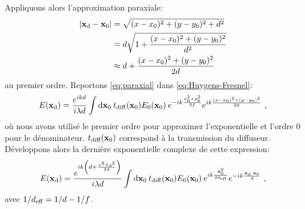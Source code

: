 Appliquons alors l'approximation paraxiale:
\begin{align}
\left| \mathbf{x}_{\mathrm{d}} - \mathbf{x}_0 \right| &= \sqrt{(x-x_0)^2+(y-y_0)^2+d^2} \\
& = d \sqrt{1+\frac{(x-x_0)^2+(y-y_0)^2}{d^2}} \\
& \approx d+ \frac{(x-x_0)^2+(y-y_0)^2}{2d}
\label{eq:paraxial}
\end{align}
au premier ordre. Reportons \ref{eq:paraxial} dans \ref{eq:Huygens-Fresnel}:
\begin{equation}
E(\mathbf{x}_{\mathrm{d}})=\frac{e^{ikd}}{i \lambda d} \int{\mathop{}\mathopen{}\mathrm{d}\mathbf{x}_0\: t_{\mathrm{diff}}(\mathbf{x}_0) E_0(\mathbf{x}_0) \: e^{-ik \frac{x_0^2+y_0^2}{2f}} e^{ik \frac{(x-x_0)^2+(y-y_0)^2}{2d}}} \text{ ,}
\end{equation}
où nous avons utilisé le premier ordre pour approximer l'exponentielle et l'ordre 0 pour le dénominateur. $t_{\mathrm{diff}}(\mathbf{x}_0)$ correspond à la transmission du diffuseur. Développons alors la dernière exponentielle complexe de cette expression:
\begin{equation}
E(\mathbf{x}_{\mathrm{d}})=\frac{e^{i k \left( d + \frac{x^2 + y^2}{2 d}\right) }}{i \lambda d} \int{\mathop{}\mathopen{}\mathrm{d}\mathbf{x}_0\: t_{\mathrm{diff}}(\mathbf{x}_0) E_0(\mathbf{x}_0) \: e^{ik \frac{\mathbf{x}_0^2}{2 d_{\mathrm{eff}}}} e^{-ik\frac{\mathbf{x}_{\mathrm{d}}. \mathbf{x}_0}{d}}} \text{ ,}
\end{equation}
avec $1/d_{\mathrm{eff}}=1/d-1/f$.




